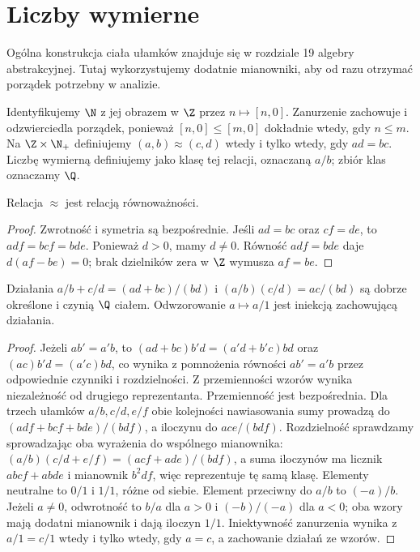 \section{Liczby wymierne}
\label{ma1:sec:rationals}
Ogólna konstrukcja ciała ułamków znajduje się w rozdziale 19 algebry abstrakcyjnej. Tutaj wykorzystujemy dodatnie mianowniki, aby od razu otrzymać porządek potrzebny w analizie.
\begin{definicja}
\label{ma1:def:rational-quotient}
Identyfikujemy $\N$ z jej obrazem w $\Z$ przez $n\mapsto[n,0]$. Zanurzenie zachowuje i odzwierciedla porządek, ponieważ $[n,0]\le[m,0]$ dokładnie wtedy, gdy $n\le m$. Na $\Z\times\N_+$ definiujemy $(a,b)\approx(c,d)$ wtedy i tylko wtedy, gdy $ad=bc$. Liczbę wymierną definiujemy jako klasę tej relacji, oznaczaną $a/b$; zbiór klas oznaczamy $\Q$.
\end{definicja}
\begin{lemat}
Relacja $\approx$ jest relacją równoważności.
\end{lemat}
\begin{proof}
Zwrotność i symetria są bezpośrednie. Jeśli $ad=bc$ oraz $cf=de$, to $adf=bcf=bde$. Ponieważ $d>0$, mamy $d\ne0$. Równość $adf=bde$ daje $d(af-be)=0$; brak dzielników zera w $\Z$ wymusza $af=be$.
\end{proof}
\begin{twierdzenie}
\label{ma1:thm:rational-field}
Działania $a/b+c/d=(ad+bc)/(bd)$ i $(a/b)(c/d)=ac/(bd)$ są dobrze określone i czynią $\Q$ ciałem. Odwzorowanie $a\mapsto a/1$ jest iniekcją zachowującą działania.
\end{twierdzenie}
\begin{proof}
Jeżeli $ab'=a'b$, to $(ad+bc)b'd=(a'd+b'c)bd$ oraz $(ac)b'd=(a'c)bd$, co wynika z pomnożenia równości $ab'=a'b$ przez odpowiednie czynniki i rozdzielności. Z przemienności wzorów wynika niezależność od drugiego reprezentanta.
Przemienność jest bezpośrednia. Dla trzech ułamków $a/b,c/d,e/f$ obie kolejności nawiasowania sumy prowadzą do $(adf+bcf+bde)/(bdf)$, a iloczynu do $ace/(bdf)$. Rozdzielność sprawdzamy sprowadzając oba wyrażenia do wspólnego mianownika: $(a/b)(c/d+e/f)=(acf+ade)/(bdf)$, a suma iloczynów ma licznik $abcf+abde$ i mianownik $b^2df$, więc reprezentuje tę samą klasę. Elementy neutralne to $0/1$ i $1/1$, różne od siebie. Element przeciwny do $a/b$ to $(-a)/b$. Jeżeli $a\ne0$, odwrotność to $b/a$ dla $a>0$ i $(-b)/(-a)$ dla $a<0$; oba wzory mają dodatni mianownik i dają iloczyn $1/1$. Iniektywność zanurzenia wynika z $a/1=c/1$ wtedy i tylko wtedy, gdy $a=c$, a zachowanie działań ze wzorów.
\end{proof}
